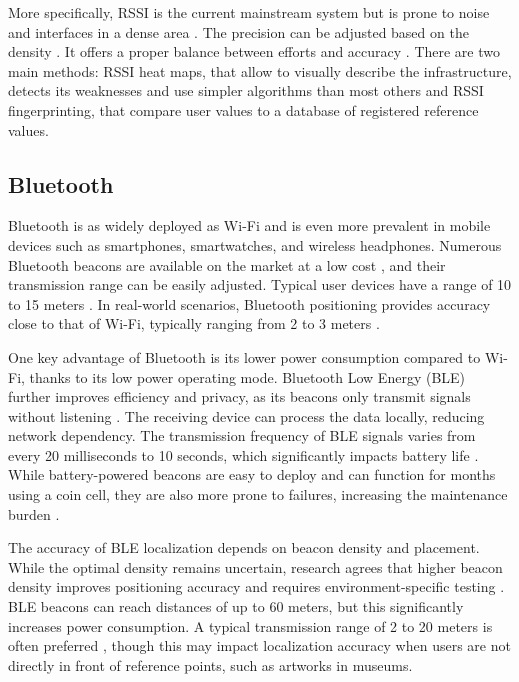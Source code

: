 More specifically, RSSI is the current mainstream system but is prone to noise and interfaces in a dense area \cite{spachos_ble_2020}. The precision can be adjusted based on the density \cite{shang_overview_2022}. It offers a proper balance between efforts and accuracy \cite{ali_locali_2017}. There are two main methods:
 RSSI heat maps, that allow to visually describe the infrastructure, detects its weaknesses and use simpler algorithms than most others \cite{ali_locali_2017} and RSSI fingerprinting, that compare user values to a database of registered reference values. 

\subsection{Bluetooth}

Bluetooth is as widely deployed as Wi-Fi and is even more prevalent in mobile devices such as smartphones, smartwatches, and wireless headphones. Numerous Bluetooth beacons are available on the market at a low cost \cite{spachos_ble_2020}, and their transmission range can be easily adjusted. Typical user devices have a range of 10 to 15 meters \cite{mainetti_survey_2014}. In real-world scenarios, Bluetooth positioning provides accuracy close to that of Wi-Fi, typically ranging from 2 to 3 meters \cite{mainetti_survey_2014} \cite{spachos_ble_2020}.   

One key advantage of Bluetooth is its lower power consumption compared to Wi-Fi, thanks to its low power  operating mode. Bluetooth Low Energy (BLE) further improves efficiency and privacy, as its beacons only transmit signals without listening \cite{spachos_ble_2020}. The receiving device can process the data locally, reducing network dependency. The transmission frequency of BLE signals varies from every 20 milliseconds to 10 seconds, which significantly impacts battery life \cite{spachos_ble_2020}. While battery-powered beacons are easy to deploy and can function for months using a coin cell, they are also more prone to failures, increasing the maintenance burden \cite{spachos_ble_2020}.   

The accuracy of BLE localization depends on beacon density and placement. While the optimal density remains uncertain, research agrees that higher beacon density improves positioning accuracy and requires environment-specific testing \cite{spachos_ble_2020} \cite{shang_overview_2022}. BLE beacons can reach distances of up to 60 meters, but this significantly increases power consumption. A typical transmission range of 2 to 20 meters is often preferred \cite{spachos_ble_2020}, though this may impact localization accuracy when users are not directly in front of reference points, such as artworks in museums.   

